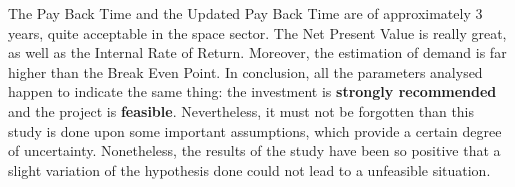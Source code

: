 The Pay Back Time and the Updated Pay Back Time are of approximately 3 years, quite acceptable in the space sector. The Net Present Value is really great, as well as the Internal Rate of Return. Moreover, the estimation of demand is far higher than the Break Even Point. In conclusion, all the parameters analysed happen to indicate the same thing: the investment is \textbf{strongly recommended} and the project is \textbf{feasible}. Nevertheless, it must not be forgotten than this study is done upon some important assumptions, which provide a certain degree of uncertainty. Nonetheless, the results of the study have been so positive that a slight variation of the hypothesis done could not lead to a unfeasible situation. 